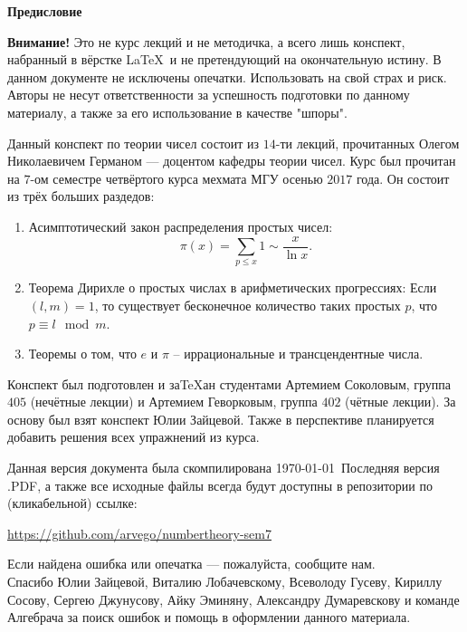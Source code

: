 \begin{center}
	\Large \bf{Предисловие}~\\
\end{center}

\tab \textbf{Внимание!} Это не курс лекций и не методичка, а всего лишь конспект, набранный в вёрстке \LaTeX~{}и не претендующий на окончательную истину. В данном документе не исключены опечатки. Использовать на свой страх и риск. Авторы не несут ответственности за успешность подготовки по данному материалу, а также за его использование в качестве "шпоры".

\tab Данный конспект по теории чисел состоит из $14$-ти лекций, прочитанных Олегом Николаевичем Германом --- доцентом кафедры теории чисел. Курс был прочитан на $7$-ом семестре четвёртого курса мехмата МГУ осенью $2017$ года. Он состоит из трёх больших раздедов:
\begin{enumerate}[nolistsep]
	\item Асимптотический закон распределения простых чисел:
			$$\pi(x) = \sum_{p \leq x} 1 \sim \frac{x}{\ln x}.$$
	\item Теорема Дирихле о простых числах в арифметических прогрессиях:
			Если $(l, m) = 1$, то существует бесконечное количество таких простых $p$, что $p \equiv l \mod m$.
	\item Теоремы о том, что  $e$ и $\pi$ -- иррациональные и трансцендентные числа.
\end{enumerate}

\tab Конспект был подготовлен и за\TeX ан студентами Артемием Соколовым, группа $405$ (нечётные лекции) и Артемием Геворковым, группа $402$ (чётные лекции). За основу был взят конспект Юлии Зайцевой. Также в перспективе планируется добавить решения всех упражнений из курса.

\tab Данная версия документа была скомпилирована \today~{}Последняя версия .PDF, а также все исходные файлы всегда будут доступны в репозитории по (кликабельной) ссылке:
\begin{center}
\href{https://github.com/arvego/numbertheory-sem7}{https://github.com/arvego/numbertheory-sem7}
\end{center}
Если найдена ошибка или опечатка --- пожалуйста, сообщите нам.\\



\tab Спасибо Юлии Зайцевой, Виталию Лобачевскому, Всеволоду Гусеву, Кириллу Сосову, Сергею Джунусову, Айку Эминяну, Александру Думаревскову и команде Алгебрача за поиск ошибок и помощь в оформлении данного материала.